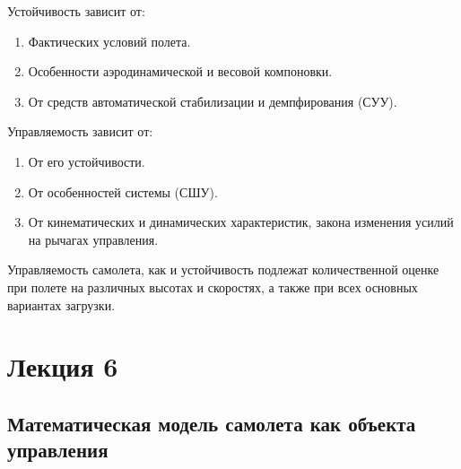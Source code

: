 \documentclass{article}
\begin{document}
Устойчивость зависит от:
\begin{enumerate}
	\item Фактических условий полета.
	\item Особенности аэродинамической и весовой компоновки.
	\item От средств автоматической стабилизации и демпфирования (СУУ).
\end{enumerate}
Управляемость зависит от:
\begin{enumerate}
	\item От его устойчивости.
	\item От особенностей системы (СШУ).
	\item От кинематических и динамических характеристик, закона изменения усилий на рычагах управления.
\end{enumerate}

Управляемость самолета, как и устойчивость подлежат количественной оценке при полете на различных высотах и скоростях, а также при всех основных вариантах загрузки.

\newpage
\section{Лекция 6}
\subsection{Математическая модель самолета как объекта управления}
\end{document}
